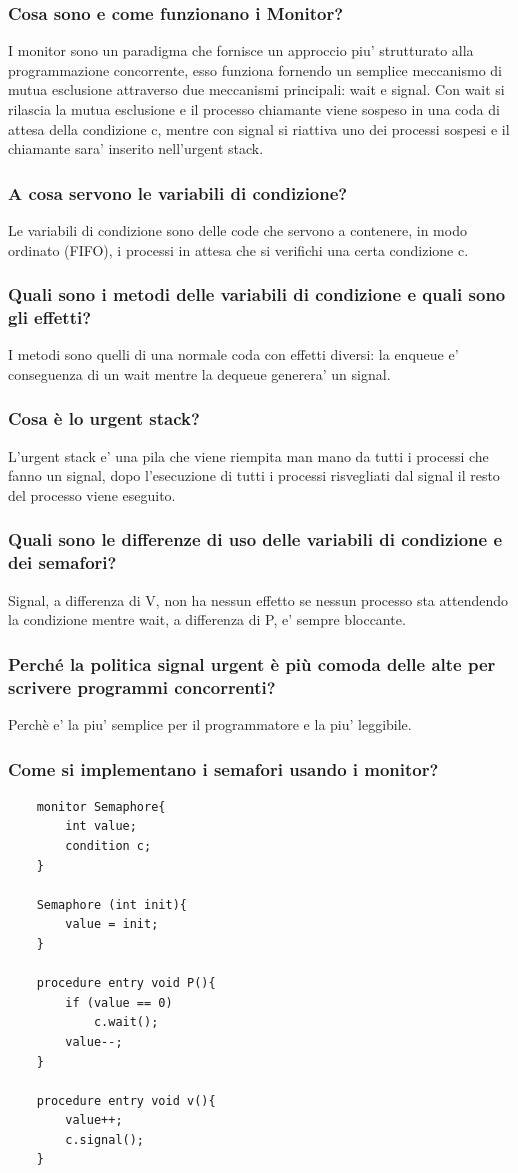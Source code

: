 \documentclass{article}
\begin{document}
\subsubsection{Cosa sono e come funzionano i Monitor?}
I monitor sono un paradigma che fornisce un approccio piu' strutturato alla
programmazione concorrente, esso funziona fornendo un semplice meccanismo di
mutua esclusione attraverso due meccanismi principali: wait e signal. Con wait
si rilascia la mutua esclusione e il processo chiamante viene sospeso in una
coda di attesa della condizione c, mentre con signal si riattiva uno dei
processi sospesi e il chiamante sara' inserito nell'urgent stack.
\subsubsection{A cosa servono le variabili di condizione?}
Le variabili di condizione sono delle code che servono a contenere, in modo
ordinato (FIFO), i processi in attesa che si verifichi una certa condizione c.
\subsubsection{Quali sono i metodi delle variabili di condizione e quali sono gli effetti?}
I metodi sono quelli di una normale coda con effetti diversi: la enqueue e'
conseguenza di un wait mentre la dequeue generera' un signal.
\subsubsection{Cosa è lo urgent stack?}
L'urgent stack e' una pila che viene riempita man mano da tutti i processi che
fanno un signal, dopo l'esecuzione di tutti i processi risvegliati dal signal
il resto del processo viene eseguito.
\subsubsection{Quali sono le differenze di uso delle variabili di condizione e dei semafori?}
Signal, a differenza di V, non ha nessun effetto se nessun processo sta
attendendo la condizione mentre wait, a differenza di P, e' sempre bloccante.
\subsubsection{Perché la politica signal urgent è più comoda delle alte per scrivere programmi concorrenti?}
Perchè e' la piu' semplice per il programmatore e la piu' leggibile.
\subsubsection{Come si implementano i semafori usando i monitor?}
\begin{verbatim}
    monitor Semaphore{
        int value;
        condition c;
    }

    Semaphore (int init){
        value = init;
    }

    procedure entry void P(){
        if (value == 0)
            c.wait();
        value--;
    }

    procedure entry void v(){
        value++;
        c.signal();
    }
\end{verbatim}
\end{document}
